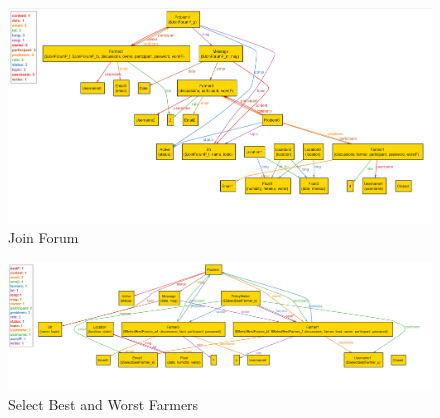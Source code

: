 \begin{figure}[H]
  \centering
  \includegraphics[width=0.9\textheight,keepaspectratio, angle=90]{figures/joinForum.png}
  \caption{Join Forum}
\end{figure}
\begin{figure}[H]
  \centering
  \includegraphics[width=0.9\textheight,keepaspectratio, angle=90]{figures/SelectBestandWorst.png}
  \caption{Select Best and Worst Farmers}
\end{figure}
\clearpage
